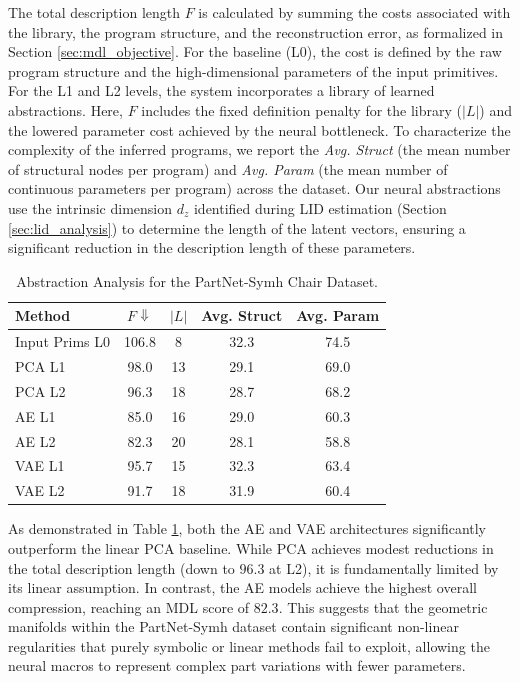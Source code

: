 \documentclass{thesis}
\begin{document}
The total description length $F$ is calculated by summing the costs associated with the library, the program structure, and the reconstruction error, as formalized in Section \ref{sec:mdl_objective}. For the baseline (L0), the cost is defined by the raw program structure and the high-dimensional parameters of the input primitives. For the L1 and L2 levels, the system incorporates a library of learned abstractions. Here, $F$ includes the fixed definition penalty for the library ($|L|$) and the lowered parameter cost achieved by the neural bottleneck. To characterize the complexity of the inferred programs, we report the \textit{Avg. Struct} (the mean number of structural nodes per program) and \textit{Avg. Param} (the mean number of continuous parameters per program) across the dataset. Our neural abstractions use the intrinsic dimension $d_z$ identified during LID estimation (Section \ref{sec:lid_analysis}) to determine the length of the latent vectors, ensuring a significant reduction in the description length of these parameters.

\begin{table}[ht]
\centering
\caption{Abstraction Analysis for the PartNet-Symh Chair Dataset.}
\label{tab:complexity_analysis}
\begin{tabular}{l cccc}
\toprule
Method & $F \Downarrow$ & $|L|$ & Avg. Struct & Avg. Param \\
\midrule
Input Prims L0 & 106.8 & 8 & 32.3 & 74.5 \\
PCA L1  & 98.0 & 13 & 29.1 & 69.0 \\
PCA L2  & 96.3 & 18 & 28.7 & 68.2 \\
AE L1  & 85.0 & 16 & 29.0 & 60.3 \\
AE L2  & 82.3 & 20 & 28.1 & 58.8 \\
VAE L1  & 95.7 & 15 & 32.3 & 63.4 \\
VAE L2  & 91.7 & 18 & 31.9 & 60.4 \\
\bottomrule
\end{tabular}
\end{table}

As demonstrated in Table \ref{tab:complexity_analysis}, both the AE and VAE architectures significantly outperform the linear PCA baseline. While PCA achieves modest reductions in the total description length (down to $96.3$ at L2), it is fundamentally limited by its linear assumption. In contrast, the AE models achieve the highest overall compression, reaching an MDL score of $82.3$. This suggests that the geometric manifolds within the PartNet-Symh dataset contain significant non-linear regularities that purely symbolic or linear methods fail to exploit, allowing the neural macros to represent complex part variations with fewer parameters.
\end{document}
